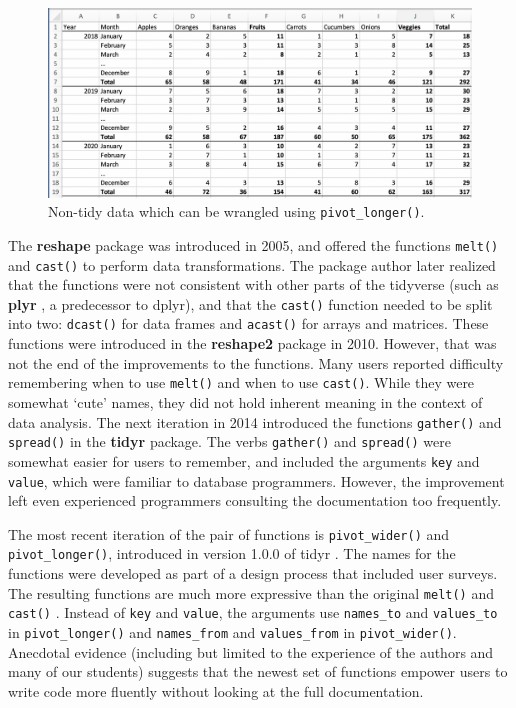 \documentclass[12pt]{article}
\begin{document}
\linespread{1}
\begin{figure}[H]

{\centering \includegraphics[width=0.95\linewidth]{images/fruitveggies} 

}

\caption{Non-tidy data which can be wrangled using \texttt{pivot\_longer()}.}\label{fig:fruitveggie}
\end{figure}\linespread{2}
\vspace{3mm}\setlength{\parindent}{15pt}

The \textbf{reshape} package \citep{R-reshape} was introduced in 2005,
and offered the functions \texttt{melt()} and \texttt{cast()} to perform
data transformations. The package author later realized that the
functions were not consistent with other parts of the tidyverse (such as
\textbf{plyr} \citep{R-plyr}, a predecessor to dplyr), and that the
\texttt{cast()} function needed to be split into two: \texttt{dcast()}
for data frames and \texttt{acast()} for arrays and matrices. These
functions were introduced in the \textbf{reshape2} \citep{R-reshape2}
package in 2010. However, that was not the end of the improvements to
the functions. Many users reported difficulty remembering when to use
\texttt{melt()} and when to use \texttt{cast()}. While they were
somewhat `cute' names, they did not hold inherent meaning in the context
of data analysis. The next iteration in 2014 introduced the functions
\texttt{gather()} and \texttt{spread()} in the \textbf{tidyr}
\citep{R-tidyr} package. The verbs \texttt{gather()} and
\texttt{spread()} were somewhat easier for users to remember, and
included the arguments \texttt{key} and \texttt{value}, which were
familiar to database programmers. However, the improvement left even
experienced programmers consulting the documentation too frequently.

The most recent iteration of the pair of functions is
\texttt{pivot\_wider()} and \texttt{pivot\_longer()}, introduced in
version 1.0.0 of tidyr \citep{R-tidyr}. The names for the functions were
developed as part of a design process that included user surveys. The
resulting functions are much more expressive than the original
\texttt{melt()} and \texttt{cast()} \citep{pivot-tweet}. Instead of
\texttt{key} and \texttt{value}, the arguments use \texttt{names\_to}
and \texttt{values\_to} in \texttt{pivot\_longer()} and
\texttt{names\_from} and \texttt{values\_from} in
\texttt{pivot\_wider()}. Anecdotal evidence (including but limited to
the experience of the authors and many of our students) suggests that
the newest set of functions empower users to write code more fluently
without looking at the full documentation.
\end{document}

